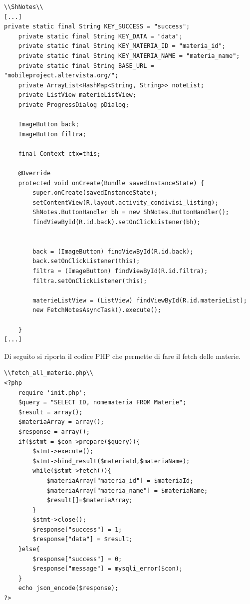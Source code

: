 \documentclass[a4paper, 50pt, twoside]{article}
\begin{document}
\begin{lstlisting}
\\ShNotes\\
[...]
private static final String KEY_SUCCESS = "success";
    private static final String KEY_DATA = "data";
    private static final String KEY_MATERIA_ID = "materia_id";
    private static final String KEY_MATERIA_NAME = "materia_name";
    private static final String BASE_URL = "mobileproject.altervista.org/";
    private ArrayList<HashMap<String, String>> noteList;
    private ListView materieListView;
    private ProgressDialog pDialog;

    ImageButton back;
    ImageButton filtra;

    final Context ctx=this;

    @Override
    protected void onCreate(Bundle savedInstanceState) {
        super.onCreate(savedInstanceState);
        setContentView(R.layout.activity_condivisi_listing);
        ShNotes.ButtonHandler bh = new ShNotes.ButtonHandler();
        findViewById(R.id.back).setOnClickListener(bh);


        back = (ImageButton) findViewById(R.id.back);
        back.setOnClickListener(this);
        filtra = (ImageButton) findViewById(R.id.filtra);
        filtra.setOnClickListener(this);

        materieListView = (ListView) findViewById(R.id.materieList);
        new FetchNotesAsyncTask().execute();

    }
[...]
\end{lstlisting}
\newpage
Di seguito si riporta il codice PHP che permette di fare il fetch delle materie.
\begin{lstlisting}
\\fetch_all_materie.php\\
<?php  
	require 'init.php';
	$query = "SELECT ID, nomemateria FROM Materie";
	$result = array();
	$materiaArray = array();
	$response = array();
	if($stmt = $con->prepare($query)){
		$stmt->execute();
		$stmt->bind_result($materiaId,$materiaName);				
		while($stmt->fetch()){
			$materiaArray["materia_id"] = $materiaId;
			$materiaArray["materia_name"] = $materiaName;
			$result[]=$materiaArray;	
		}
		$stmt->close();
		$response["success"] = 1;
		$response["data"] = $result;
	}else{
		$response["success"] = 0;
		$response["message"] = mysqli_error($con);	
	}
	echo json_encode($response);
?>  
\end{lstlisting}
\end{document}
